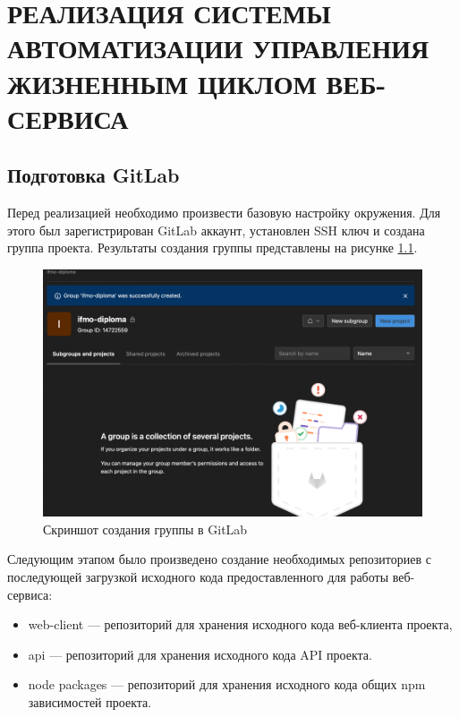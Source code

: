\chapter{РЕАЛИЗАЦИЯ СИСТЕМЫ АВТОМАТИЗАЦИИ УПРАВЛЕНИЯ ЖИЗНЕННЫМ ЦИКЛОМ ВЕБ-СЕРВИСА}
\label{cha:impl}

\section{Подготовка GitLab}

Перед реализацией необходимо произвести базовую настройку окружения.
Для этого был зарегистрирован GitLab аккаунт, установлен SSH ключ и создана группа проекта.
Результаты создания группы представлены на рисунке \ref{fig:group-ready}.

\begin{figure}[ht]
    \centering
    \includegraphics[scale=0.4]{src/figures/0}
    \caption{Скриншот создания группы в GitLab}
    \label{fig:group-ready}
\end{figure}

Следующим этапом было произведено создание необходимых репозиториев с последующей загрузкой исходного кода предоставленного для работы веб-сервиса:

\begin{itemize}
    \item web-client --- репозиторий для хранения исходного кода веб-клиента проекта,
    \item api --- репозиторий для хранения исходного кода API проекта.
    \item node packages --- репозиторий для хранения исходного кода общих npm зависимостей проекта.
\end{itemize}

